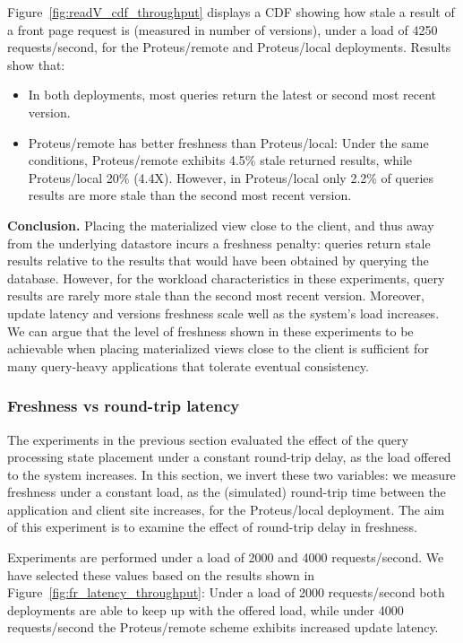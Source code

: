Figure~\ref{fig:readV_cdf_throughput} displays a CDF showing how stale a result of a front page request is
(measured in number of versions),
under a load of 4250 requests/second, for the Proteus/remote and Proteus/local deployments.
Results show that:
\begin{itemize}
  \item In both deployments, most queries return the latest or second most recent version.
  \item Proteus/remote has better freshness than Proteus/local:
  Under the same conditions, Proteus/remote exhibits 4.5\% stale returned results,
  while Proteus/local 20\% (4.4X).
  However, in Proteus/local only 2.2\% of queries results are more stale than the second most recent version.
\end{itemize}

\medskip
\noindent
\textbf{Conclusion.}
Placing the materialized view close to the client, and thus away from the underlying datastore incurs a freshness penalty:
queries return stale results relative to the results that would have been obtained by querying the database.
However, for the workload characteristics in these experiments,
query results are rarely more stale than the second most recent version.
Moreover, update latency and versions freshness scale well as the system's load increases.
We can argue that the level of freshness shown in these experiments to be achievable when placing materialized views close
to the client is sufficient for many query-heavy applications that tolerate eventual consistency.

\subsubsection{Freshness vs round-trip latency}
\label{sec:eval_freshness_rtt}

The experiments in the previous section evaluated the effect of the query processing state placement under a constant
round-trip delay, as the load offered to the system increases.
In this section, we invert these two variables:
we measure freshness under a constant load,
as the (simulated) round-trip time between the application and client site increases,
for the Proteus/local deployment.
The aim of this experiment is to examine the effect of round-trip delay in freshness.

Experiments are performed under a load of 2000 and 4000 requests/second.
We have selected these values based on the results shown in Figure~\ref{fig:fr_latency_throughput}:
Under a load of 2000 requests/second both deployments are able to keep up with the offered load,
while under 4000 requests/second the Proteus/remote scheme exhibits increased update latency.

